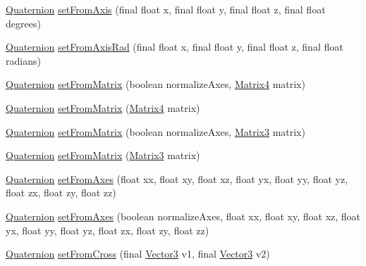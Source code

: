 \begin{DoxyCompactItemize}
\item 
\hyperlink{classairhockeyjava_1_1util_1_1_quaternion}{Quaternion} \hyperlink{classairhockeyjava_1_1util_1_1_quaternion_a9e9a4cf56ed506bac9666bc4b69d91b2}{set\+From\+Axis} (final float x, final float y, final float z, final float degrees)
\item 
\hyperlink{classairhockeyjava_1_1util_1_1_quaternion}{Quaternion} \hyperlink{classairhockeyjava_1_1util_1_1_quaternion_aaea43788b55085b7cc141997084ee842}{set\+From\+Axis\+Rad} (final float x, final float y, final float z, final float radians)
\item 
\hyperlink{classairhockeyjava_1_1util_1_1_quaternion}{Quaternion} \hyperlink{classairhockeyjava_1_1util_1_1_quaternion_a76322e97eadb187b9b0dd0655784f259}{set\+From\+Matrix} (boolean normalize\+Axes, \hyperlink{classairhockeyjava_1_1util_1_1_matrix4}{Matrix4} matrix)
\item 
\hyperlink{classairhockeyjava_1_1util_1_1_quaternion}{Quaternion} \hyperlink{classairhockeyjava_1_1util_1_1_quaternion_a80eadd588766028847d07e525afa885e}{set\+From\+Matrix} (\hyperlink{classairhockeyjava_1_1util_1_1_matrix4}{Matrix4} matrix)
\item 
\hyperlink{classairhockeyjava_1_1util_1_1_quaternion}{Quaternion} \hyperlink{classairhockeyjava_1_1util_1_1_quaternion_ab2250df43bc56d26f20ee87738f57757}{set\+From\+Matrix} (boolean normalize\+Axes, \hyperlink{classairhockeyjava_1_1util_1_1_matrix3}{Matrix3} matrix)
\item 
\hyperlink{classairhockeyjava_1_1util_1_1_quaternion}{Quaternion} \hyperlink{classairhockeyjava_1_1util_1_1_quaternion_a431e4e40b42251507e2078cf0d9bb5e5}{set\+From\+Matrix} (\hyperlink{classairhockeyjava_1_1util_1_1_matrix3}{Matrix3} matrix)
\item 
\hyperlink{classairhockeyjava_1_1util_1_1_quaternion}{Quaternion} \hyperlink{classairhockeyjava_1_1util_1_1_quaternion_a3189cb5f269813a8f03ab605785b14a3}{set\+From\+Axes} (float xx, float xy, float xz, float yx, float yy, float yz, float zx, float zy, float zz)
\item 
\hyperlink{classairhockeyjava_1_1util_1_1_quaternion}{Quaternion} \hyperlink{classairhockeyjava_1_1util_1_1_quaternion_aae81ffd8ed828fc733bf35829472613c}{set\+From\+Axes} (boolean normalize\+Axes, float xx, float xy, float xz, float yx, float yy, float yz, float zx, float zy, float zz)
\item 
\hyperlink{classairhockeyjava_1_1util_1_1_quaternion}{Quaternion} \hyperlink{classairhockeyjava_1_1util_1_1_quaternion_ac0cf3b22eaa8c0554ac3d5438715b9f7}{set\+From\+Cross} (final \hyperlink{classairhockeyjava_1_1util_1_1_vector3}{Vector3} v1, final \hyperlink{classairhockeyjava_1_1util_1_1_vector3}{Vector3} v2)

\end{DoxyCompactItemize}
